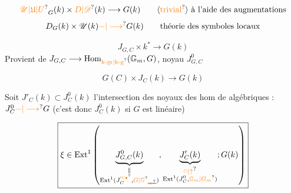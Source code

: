 \[
{\unsure{\mathscr U|\mathfrak U|U}}_G(k)\times\unsure{D|\mathscr D}(k)\longrightarrow G(k)
\qquad\text{\inserted{\unsure{trivial}} à l'aide des augmentations}
\]
\[
D_G(k)\times\mathscr U(k)\unsure{-|\longrightarrow}G(k)\qquad\text{théorie des symboles locaux}
\]

\[
J_{G,C}\times k^*\longrightarrow G(k)
\]
Provient de $J_{G,C}\longrightarrow\operatorname{Hom}_{\text{\unsure{k-gr|k-g}}}(\mathbb G_m,G)$, noyau $J_{G,C}^0$

\[
G(C)\times J_C(k)\longrightarrow G(k)
\]

Soit $J'_C(k)\subset J_C^0(k)$ l'intersection des noyaux des hom de  algébriques : $J_C^0\unsure{-|\longrightarrow}G$ (c'est donc $J_C^0(k)$ si $G$ est linéaire)

\[
\boxed{\xi\in\operatorname{Ext}^1\left(
\underbrace{J_{G,C}^0(k)}_{\substack{\Vert\\\operatorname{Ext}^1(J_C^{\unsure{0|\bullet}},{\unsure{G|\mathbb G}}_{\deleted{\unsure{m}}})}},
\underbrace{J'_C(k)}_{\substack{\unsure{\cap|\uparrow}\\\operatorname{Ext}^1(J_C^0,\unsure{\mathbb G_m|G_m})}};
G(k)\right)}
\]
